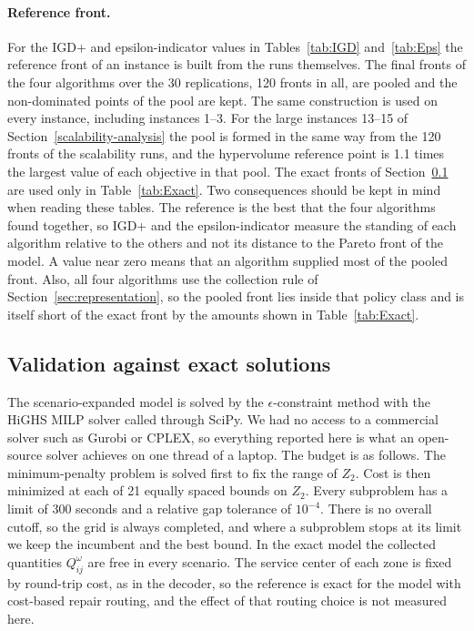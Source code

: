 \documentclass[11pt, a4paper]{article}
\begin{document}
\paragraph{Reference front.} For the IGD+ and epsilon-indicator values in Tables~\ref{tab:IGD} and~\ref{tab:Eps} the reference front of an instance is built from the runs themselves. The final fronts of the four algorithms over the 30 replications, 120 fronts in all, are pooled and the non-dominated points of the pool are kept. The same construction is used on every instance, including instances 1--3. For the large instances 13--15 of Section~\ref{scalability-analysis} the pool is formed in the same way from the 120 fronts of the scalability runs, and the hypervolume reference point is 1.1 times the largest value of each objective in that pool. The exact fronts of Section~\ref{validation-against-exact-solutions} are used only in Table~\ref{tab:Exact}. Two consequences should be kept in mind when reading these tables. The reference is the best that the four algorithms found together, so IGD+ and the epsilon-indicator measure the standing of each algorithm relative to the others and not its distance to the Pareto front of the model. A value near zero means that an algorithm supplied most of the pooled front. Also, all four algorithms use the collection rule of Section~\ref{sec:representation}, so the pooled front lies inside that policy class and is itself short of the exact front by the amounts shown in Table~\ref{tab:Exact}.
\hypertarget{validation-against-exact-solutions}{%
\subsection{Validation against exact
solutions}\label{validation-against-exact-solutions}}
The scenario-expanded model is solved by the $\epsilon$-constraint method with the HiGHS MILP solver called through SciPy. We had no access to a commercial solver such as Gurobi or CPLEX, so everything reported here is what an open-source solver achieves on one thread of a laptop. The budget is as follows. The minimum-penalty problem is solved first to fix the range of $Z_2$. Cost is then minimized at each of 21 equally spaced bounds on $Z_2$. Every subproblem has a limit of 300 seconds and a relative gap tolerance of $10^{-4}$. There is no overall cutoff, so the grid is always completed, and where a subproblem stops at its limit we keep the incumbent and the best bound. In the exact model the collected quantities $Q_{ij}^{\omega}$ are free in every scenario. The service center of each zone is fixed by round-trip cost, as in the decoder, so the reference is exact for the model with cost-based repair routing, and the effect of that routing choice is not measured here.
\end{document}
